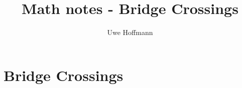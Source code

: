 

\title{Math notes - Bridge Crossings}
\author{Uwe Hoffmann}



\setcounter{chapter}{1}
\chapter*{Bridge Crossings}
